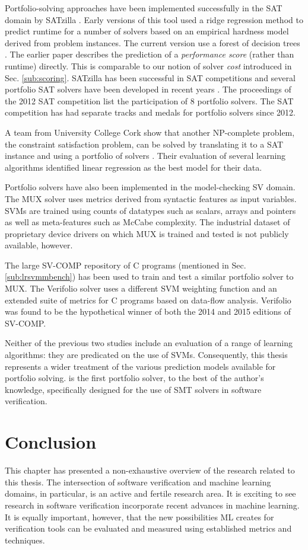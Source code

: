 Portfolio-solving approaches have been implemented successfully in the SAT domain by SATzilla \cite{Satzilla}. Early versions of this tool used a ridge regression method to predict runtime for a number of solvers based on an empirical hardness model derived from problem instances. The current version \cite{SATzilla2012} use a forest of decision trees . The earlier paper describes the prediction of a \textit{performance score} (rather than runtime) directly.  This is comparable to our notion of solver \textit{cost} introduced in Sec. \ref{sub:scoring}. SATzilla has been successful in SAT competitions and several portfolio SAT solvers have been developed in recent years \cite{SAT2012}.  The proceedings of the 2012 SAT competition 
list the participation of 8 portfolio solvers. The SAT competition has had separate tracks and medals for portfolio solvers since 2012.  

A team from University College Cork show that another NP-complete problem, the constraint satisfaction problem, can be solved by translating it to a SAT instance and using a portfolio of solvers \cite{Hurley2014}. Their evaluation of several learning algorithms identified linear regression as the best model for their data.

Portfolio solvers have also been implemented in the model-checking SV domain. The MUX \cite{MUX} solver uses metrics derived from syntactic features as input variables. SVMs are trained using counts of datatypes such as scalars, arrays and pointers as well as meta-features such as McCabe complexity. The industrial dataset of proprietary device drivers on which MUX is trained and tested is not publicly available, however.   

The large SV-COMP repository of C programs (mentioned in Sec. \ref{sub:lrsvmmbench}) has been used to train and test a similar portfolio solver to MUX. The Verifolio \cite{DPVZ15:CAV} solver uses a different SVM weighting function and an extended suite of metrics for C programs based on data-flow analysis. Verifolio was found to be the hypothetical winner of both the 2014 and 2015 editions of SV-COMP. 

Neither of the previous two studies include an evaluation of a range of learning algorithms: they are predicated on the use of SVMs. Consequently, this thesis represents a wider treatment of the various prediction models available for portfolio solving. \where is the first portfolio solver, to the best of the author's knowledge, specifically designed for the use of SMT solvers in software verification.

\section{Conclusion}

This chapter has presented a non-exhaustive overview of the research related to this thesis. The intersection of software verification and machine learning domains, in particular, is an active and fertile research area. It is exciting to see research in software verification incorporate recent advances in machine learning. It is equally important, however, that the new possibilities ML creates for verification tools can be evaluated and measured using established metrics and techniques.    
